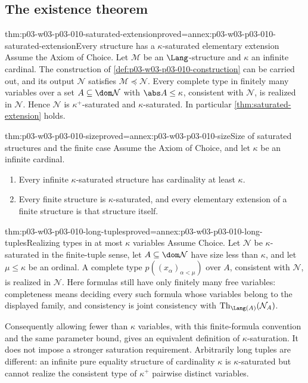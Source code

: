 \subsection{The existence theorem}
\label{sec:p03-w03-p03-010-existence}

\begin{hbtheorem}{thm:p03-w03-p03-010-saturated-extension}{proved=annex:p03-w03-p03-010-saturated-extension}{Every structure has a \(\kappa\)-saturated elementary extension}
Assume the Axiom of Choice.  Let \(\mathcal M\) be an \(\Lang\)-structure
and \(\kappa\) an infinite cardinal.  The construction of
\cref{def:p03-w03-p03-010-construction} can be carried out, and its output
\(\mathcal N\) satisfies \(\mathcal M\preccurlyeq\mathcal N\).  Every
complete type in finitely many variables over a set
\(A\subseteq\dom\mathcal N\) with \(\abs A\leq\kappa\), consistent with
\(\mathcal N\), is realized in \(\mathcal N\).  Hence \(\mathcal N\) is
\(\kappa^+\)-saturated and \(\kappa\)-saturated.  In particular
\cref{thm:saturated-extension} holds.
\end{hbtheorem}

\begin{hbcorollary}{thm:p03-w03-p03-010-size}{proved=annex:p03-w03-p03-010-size}{Size of saturated structures and the finite case}
Assume the Axiom of Choice, and let \(\kappa\) be an infinite cardinal.
\begin{enumerate}
  \item Every infinite \(\kappa\)-saturated structure has cardinality at
        least \(\kappa\).
  \item Every finite structure is \(\kappa\)-saturated, and every
        elementary extension of a finite structure is that structure
        itself.
\end{enumerate}
\end{hbcorollary}

\begin{hbcorollary}{thm:p03-w03-p03-010-long-tuples}{proved=annex:p03-w03-p03-010-long-tuples}{Realizing types in at most \(\kappa\) variables}
Assume Choice. Let \(\mathcal N\) be \(\kappa\)-saturated in the
finite-tuple sense, let \(A\subseteq\dom\mathcal N\) have size less
than \(\kappa\), and let \(\mu\leq\kappa\) be an ordinal. A complete
type \(p((x_\alpha)_{\alpha<\mu})\) over \(A\), consistent with
\(\mathcal N\), is realized in \(\mathcal N\). Here formulas still
have only finitely many free variables: completeness means deciding every
such formula whose variables belong to the displayed family, and
consistency is joint consistency with
\(\operatorname{Th}_{\Lang(A)}(\mathcal N_A)\).

Consequently allowing fewer than \(\kappa\) variables, with this
finite-formula convention and the same parameter bound, gives an
equivalent definition of \(\kappa\)-saturation. It does not impose a
stronger saturation requirement. Arbitrarily long tuples are different:
an infinite pure equality structure of cardinality \(\kappa\) is
\(\kappa\)-saturated but cannot realize the consistent type of
\(\kappa^+\) pairwise distinct variables.
\end{hbcorollary}


